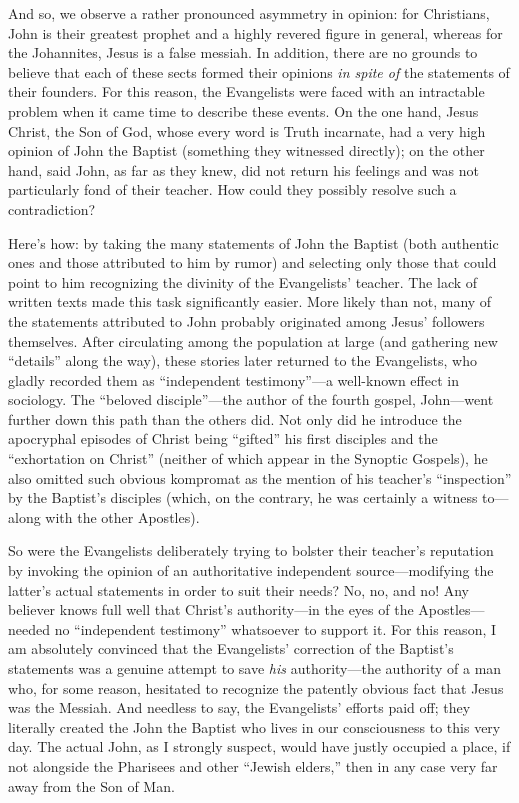 And so, we observe a rather pronounced asymmetry in opinion: for Christians, John is their greatest prophet and a highly revered figure in general, whereas for the Johannites, Jesus is a false messiah. In addition, there are no grounds to believe that each of these sects formed their opinions \emph{in spite of} the statements of their founders. For this reason, the Evangelists were faced with an intractable problem when it came time to describe these events. On the one hand, Jesus Christ, the Son of God, whose every word is Truth incarnate, had a very high opinion of John the Baptist (something they witnessed directly); on the other hand, said John, as far as they knew, did not return his feelings and was not particularly fond of their teacher. How could they possibly resolve such a contradiction?

Here's how: by taking the many statements of John the Baptist (both authentic ones and those attributed to him by rumor) and selecting only those that could point to him recognizing the divinity of the Evangelists' teacher. The lack of written texts made this task significantly easier. More likely than not, many of the statements attributed to John probably originated among Jesus' followers themselves. After circulating among the population at large (and gathering new ``details'' along the way), these stories later returned to the Evangelists, who gladly recorded them as ``independent testimony''---a well-known effect in sociology. The ``beloved disciple''---the author of the fourth gospel, John---went further down this path than the others did. Not only did he introduce the apocryphal episodes of Christ being ``gifted'' his first disciples and the ``exhortation on Christ'' (neither of which appear in the Synoptic Gospels), he also omitted such obvious kompromat as the mention of his teacher's ``inspection'' by the Baptist's disciples (which, on the contrary, he was certainly a witness to---along with the other Apostles).

So were the Evangelists deliberately trying to bolster their teacher's reputation by invoking the opinion of an authoritative independent source---modifying the latter's actual statements in order to suit their needs? No, no, and no! Any believer knows full well that Christ's authority---in the eyes of the Apostles---needed no ``independent testimony'' whatsoever to support it. For this reason, I am absolutely convinced that the Evangelists' correction of the Baptist's statements was a genuine attempt to save \emph{his} authority---the authority of a man who, for some reason, hesitated to recognize the patently obvious fact that Jesus was the Messiah. And needless to say, the Evangelists' efforts paid off; they literally created the John the Baptist who lives in our consciousness to this very day. The actual John, as I strongly suspect, would have justly occupied a place, if not alongside the Pharisees and other ``Jewish elders,'' then in any case very far away from the Son of Man.

